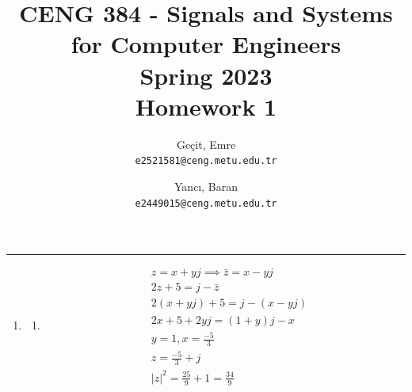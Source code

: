 \documentclass[10pt,a4paper, margin=1in]{article}
\author{
  Geçit, Emre\\
  \texttt{e2521581@ceng.metu.edu.tr}
  \and
  Yancı, Baran\\
  \texttt{e2449015@ceng.metu.edu.tr}
}
\title{CENG 384 - Signals and Systems for Computer Engineers \\
Spring 2023 \\
Homework 1}
\begin{document}
\maketitle



\noindent\rule{19cm}{1.2pt}

\begin{enumerate}

\item %
    \begin{enumerate}
    \item \begin{align*}
            &z = x + yj \implies \bar{z} = x - yj \\
            &2z + 5 = j - \bar{z} \\
            &2(x + yj) + 5 = j - (x - yj) \\
            &2x + 5 + 2yj = (1 + y)j - x \\
            &y = 1, x = \frac{-5}{3} \\
            &z = \frac{-5}{3} + j\\
            &|z|^2 = \frac{25}{9} + 1 = \frac{34}{9}
    \end{align*}


    \begin{center}
    \end{center}
      

\end{enumerate}
\end{enumerate}
\end{document}
